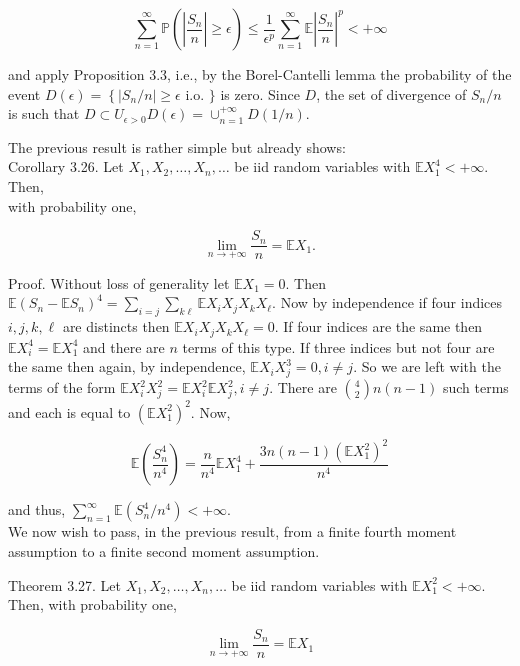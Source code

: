 \documentclass{amsbook}
\theoremstyle{plain}%
\theoremstyle{definition}
\theoremstyle{remark}
\begin{document}
    $$
    \sum_{n=1}^{\infty} \mathbb{P}\left(\left|\frac{S_{n}}{n}\right| \geq \epsilon\right) \leq \frac{1}{\epsilon^{p}} \sum_{n=1}^{\infty} \mathbb{E}\left|\frac{S_{n}}{n}\right|^{p}<+\infty
    $$

    and apply Proposition 3.3, i.e., by the Borel-Cantelli lemma the probability of the event $D(\epsilon)=\left\{\left|S_{n} / n\right| \geq \epsilon\right.$ i.o. $\}$ is zero. Since $D$, the set of divergence of $S_{n} / n$ is such that $D \subset U_{\epsilon>0} D(\epsilon)=\cup_{n=1}^{+\infty} D(1 / n)$.

    The previous result is rather simple but already shows:\\

    Corollary 3.26. Let $X_{1}, X_{2}, \ldots, X_{n}, \ldots$ be iid random variables with $\mathbb{E} X_{1}^{4}<+\infty$. Then,\\
    with probability one,

    $$
    \lim _{n \rightarrow+\infty} \frac{S_{n}}{n}=\mathbb{E} X_{1} .
    $$

    Proof. Without loss of generality let $\mathbb{E} X_{1}=0$. Then $\mathbb{E}\left(S_{n}-\mathbb{E} S_{n}\right)^{4}=\sum_{i=j} \sum_{k \ell} \mathbb{E} X_{i} X_{j} X_{k} X_{\ell}$. Now by independence if four indices $i, j, k, \ell$ are distincts then $\mathbb{E} X_{i} X_{j} X_{k} X_{\ell}=0$. If four indices are the same then $\mathbb{E} X_{i}^{4}=\mathbb{E} X_{1}^{4}$ and there are $n$ terms of this type. If three indices but not four are the same then again, by independence, $\mathbb{E} X_{i} X_{j}^{3}=0, i \neq j$. So we are left with the terms of the form $\mathbb{E} X_{i}^{2} X_{j}^{2}=\mathbb{E} X_{i}^{2} \mathbb{E} X_{j}^{2}, i \neq j$. There are $\binom{4}{2} n(n-1)$ such terms and each is equal to $\left(\mathbb{E} X_{1}^{2}\right)^{2}$. Now,

    $$
    \mathbb{E}\left(\frac{S_{n}^{4}}{n^{4}}\right)=\frac{n}{n^{4}} \mathbb{E} X_{1}^{4}+\frac{3 n(n-1)\left(\mathbb{E} X_{1}^{2}\right)^{2}}{n^{4}}
    $$

    and thus, $\sum_{n=1}^{\infty} \mathbb{E}\left(S_{n}^{4} / n^{4}\right)<+\infty$.\\
    We now wish to pass, in the previous result, from a finite fourth moment assumption to a finite second moment assumption.

    Theorem 3.27. Let $X_{1}, X_{2}, \ldots, X_{n}, \ldots$ be iid random variables with $\mathbb{E} X_{1}^{2}<+\infty$. Then, with probability one,

    $$
    \lim _{n \rightarrow+\infty} \frac{S_{n}}{n}=\mathbb{E} X_{1}
    $$
\end{document}
